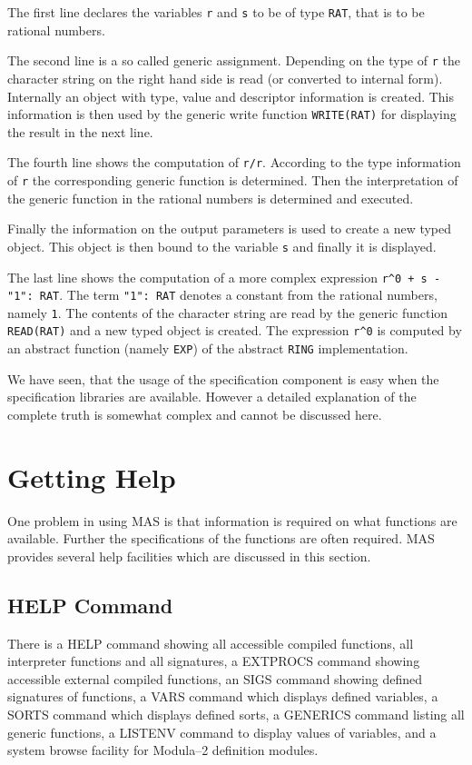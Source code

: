 The first line declares the variables \verb/r/ and \verb/s/ 
to be of type \verb/RAT/, that is to be rational numbers. 

The second line is a so called generic assignment. 
Depending on the type of \verb/r/ the character string on the
right hand side is read (or converted to internal form). 
Internally an object with type, value and descriptor information 
is created. This information is then used by the 
generic write function \verb/WRITE(RAT)/ for displaying 
the result in the next line.

The fourth line shows the computation of \verb.r/r.. 
According to the type information of \verb/r/ the 
corresponding generic function is determined. 
Then the interpretation of the generic function in 
the rational numbers is determined and executed.

Finally the information on the output parameters 
is used to create a new typed object. 
This object is then bound to 
the variable \verb/s/ and finally it is displayed.

The last line shows the computation of a more 
complex expression \verb/r^0 + s - "1": RAT/.
The term \verb/"1": RAT/ denotes a constant from 
the rational numbers, namely \verb/1/. The contents of the 
character string are read by the generic function 
\verb/READ(RAT)/ and a new typed object is created. 
The expression \verb/r^0/ is computed by an abstract function 
(namely \verb/EXP/) of the abstract \verb/RING/ implementation.

We have seen, that the usage of the specification component 
is easy when the specification libraries are available. 
However a detailed explanation of the complete truth 
is somewhat complex and cannot be discussed here. 


\section{Getting Help}

One problem in using MAS is that information is required 
on what functions are available. 
Further the specifications of the functions are often 
required.
MAS provides several help facilities which are
discussed in this section.

\subsection{HELP Command}
 
There is 
a HELP command showing all accessible 
compiled functions, all interpreter functions and 
all signatures,
a EXTPROCS command showing accessible 
external compiled functions,
an SIGS command showing defined 
signatures of functions,
a VARS command which displays defined 
variables,
a SORTS command which displays defined 
sorts,
a GENERICS command listing all 
generic functions, 
a LISTENV command to display values of 
variables,
and a system browse facility for Modula--2 
definition modules.

